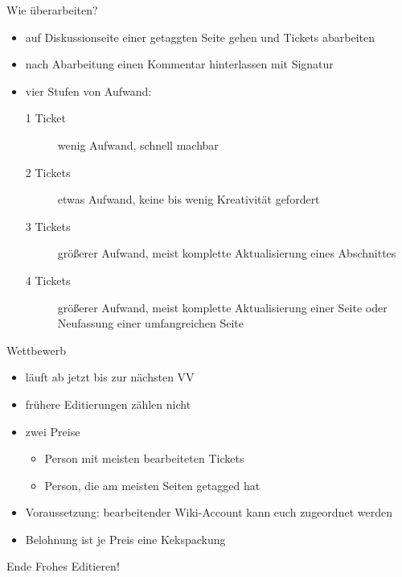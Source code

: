 \documentclass{beamer}
\begin{document}
\begin{frame}{Wie überarbeiten?}
  \begin{itemize}
    \item auf Diskussionseite einer getaggten Seite gehen und Tickets abarbeiten
    \item nach Abarbeitung einen Kommentar hinterlassen mit Signatur
    \item vier Stufen von Aufwand:
    \begin{description}
      \item[1 Ticket] wenig Aufwand, schnell machbar
      \item[2 Tickets] etwas Aufwand, keine bis wenig Kreativität gefordert
      \item[3 Tickets] größerer Aufwand, meist komplette Aktualisierung eines Abschnittes
      \item[4 Tickets] größerer Aufwand, meist komplette Aktualisierung einer Seite oder Neufassung einer umfangreichen Seite
    \end{description}
  \end{itemize}
\end{frame}

\begin{frame}{Wettbewerb}
  \begin{itemize}
    \item läuft ab jetzt bis zur nächsten VV
    \item frühere Editierungen zählen nicht
    \item zwei Preise
    \begin{itemize}
      \item Person mit meisten bearbeiteten Tickets
      \item Person, die am meisten Seiten getagged hat
    \end{itemize}
    \item Voraussetzung: bearbeitender Wiki-Account kann euch zugeordnet werden
    \item Belohnung ist je Preis eine Kekspackung
  \end{itemize}
\end{frame}

\begin{frame}{Ende}
  \centering
  Frohes Editieren!
\end{frame}
\end{document}
